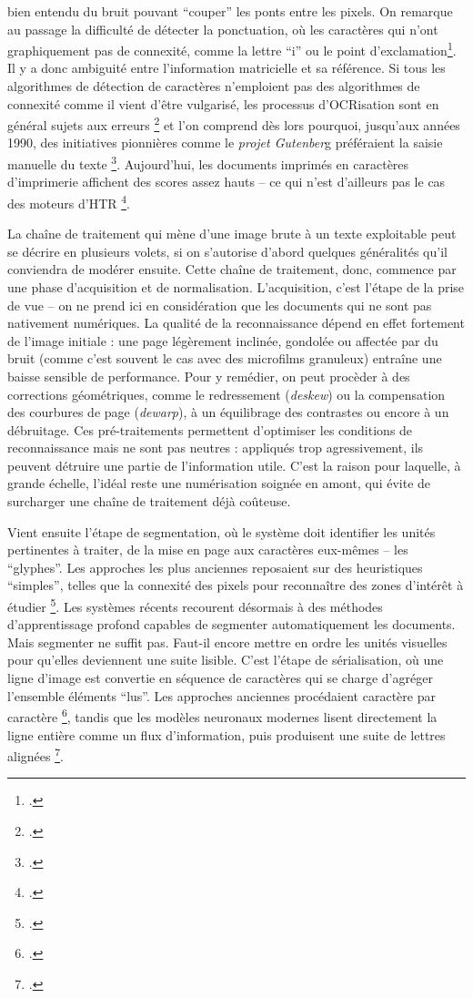 bien entendu du bruit pouvant \enquote{couper} les ponts entre les pixels. On remarque au passage la difficulté de détecter la ponctuation, où les caractères qui n'ont graphiquement pas de connexité, comme la lettre \enquote{i} ou le point d'exclamation\footcite[][]{lecolinet}. Il y a donc ambiguité entre l'information matricielle et sa référence. Si tous les algorithmes de détection de caractères n'emploient pas des algorithmes de connexité comme il vient d'être vulgarisé, les processus d'OCRisation sont en général sujets aux erreurs \footcite[][]{chiron} et l’on comprend dès lors pourquoi, jusqu’aux années 1990, des initiatives pionnières comme le \emph{projet Gutenber}g préféraient la saisie manuelle du texte \footcite[][]{bermesbook}. Aujourd'hui, les documents imprimés en caractères d'imprimerie affichent des scores assez hauts -- ce qui n'est d'ailleurs pas le cas des moteurs d'HTR \footcite[][]{chiron}.

La chaîne de traitement qui mène d’une image brute à un texte exploitable peut se décrire en plusieurs volets, si on s'autorise d'abord quelques généralités qu'il conviendra de modérer ensuite. Cette chaîne de traitement, donc, commence par une phase d’acquisition et de normalisation. L'acquisition, c'est l'étape de la prise de vue  -- on ne prend ici en considération que les documents qui ne sont pas nativement numériques. La qualité de la reconnaissance dépend en effet fortement de l’image initiale : une page légèrement inclinée, gondolée ou affectée par du bruit (comme c’est souvent le cas avec des microfilms granuleux) entraîne une baisse sensible de performance. Pour y remédier, on peut procèder à des corrections géométriques, comme le redressement (\emph{deskew}) ou la compensation des courbures de page (\emph{dewarp}), à un équilibrage des contrastes ou encore à un débruitage. Ces pré-traitements permettent d’optimiser les conditions de reconnaissance mais ne sont pas neutres : appliqués trop agressivement, ils peuvent détruire une partie de l’information utile. C’est la raison pour laquelle, à grande échelle, l’idéal reste une numérisation soignée en amont, qui évite de surcharger une chaîne de traitement déjà coûteuse.

Vient ensuite l’étape de segmentation, où le système doit identifier les unités pertinentes à traiter, de la mise en page aux caractères eux-mêmes -- les \enquote{glyphes}.  Les approches les plus anciennes reposaient sur des heuristiques \enquote{simples}, telles que  la connexité des pixels pour reconnaître des zones d'intérêt à étudier \footcite[][]{lecolinet}. Les systèmes récents recourent désormais à des méthodes d’apprentissage profond capables de segmenter automatiquement les documents. Mais segmenter ne suffit pas. Faut-il encore mettre en ordre les unités visuelles pour qu’elles deviennent une suite lisible. C’est l’étape de sérialisation, où une ligne d’image est convertie en séquence de caractères qui se charge d'agréger l'ensemble éléments \enquote{lus}. Les approches anciennes procédaient caractère par caractère \footcite[][]{lecolinet}, tandis que les modèles neuronaux modernes lisent directement la ligne entière comme un flux d’information, puis produisent une suite de lettres alignées \footcite[][]{graves}.

